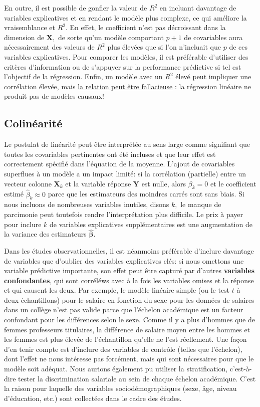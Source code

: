 \documentclass[
  11pt,
  letterpaper,
]{scrbook}
\theoremstyle{plain}
\theoremstyle{plain}
\theoremstyle{definition}
\theoremstyle{definition}
\theoremstyle{remark}
\begin{document}
En outre, il est possible de gonfler la valeur de \(R^2\) en incluant
davantage de variables explicatives et en rendant le modèle plus
complexe, ce qui améliore la vraisemblance et \(R^2.\) En effet, le
coefficient n'est pas décroissant dans la dimension de \(\mathbf{X},\)
de sorte qu'un modèle comportant \(p+1\) de covariables aura
nécessairement des valeurs de \(R^2\) plus élevées que si l'on
n'incluait que \(p\) de ces variables explicatives. Pour comparer les
modèles, il est préférable d'utiliser des critères d'information ou de
s'appuyer sur la performance prédictive si tel est l'objectif de la
régression. Enfin, un modèle avec un \(R^2\) élevé peut impliquer une
corrélation élevée, mais
\href{http://www.tylervigen.com/spurious-correlations}{la relation peut
être fallacieuse} : la régression linéaire ne produit pas de modèles
causaux!

\subsection{Colinéarité}\label{colinuxe9arituxe9}

Le postulat de linéarité peut être interprétée au sens large comme
signifiant que toutes les covariables pertinentes ont été incluses et
que leur effet est correctement spécifié dans l'équation de la moyenne.
L'ajout de covariables superflues à un modèle a un impact limité: si la
corrélation (partielle) entre un vecteur colonne \(\boldsymbol{X}_k\) et
la variable réponse \(\boldsymbol{Y}\) est nulle, alors \(\beta_k=0\) et
le coefficient estimé \(\widehat{\beta}_k \approx 0\) parce que les
estimateurs des moindres carrés sont sans biais. Si nous incluons de
nombreuses variables inutiles, disons \(k,\) le manque de parcimonie
peut toutefois rendre l'interprétation plus difficile. Le prix à payer
pour inclure \(k\) de variables explicatives supplémentaires est une
augmentation de la variance des estimateurs
\(\widehat{\boldsymbol{\beta}}.\)

Dans les études observationnelles, il est néanmoins préférable d'inclure
davantage de variables que d'oublier des variables explicatives clés: si
nous omettons une variable prédictive importante, son effet peut être
capturé par d'autres \textbf{variables confondantes}, qui sont corréléws
avec à la fois les variables omises et la réponse et qui causent les
deux. Par exemple, le modèle linéaire simple (ou le test \(t\) à deux
échantillons) pour le salaire en fonction du sexe pour les données de
salaires dans un collège n'est pas valide parce que l'échelon académique
est un facteur confondant pour les différences selon le sexe. Comme il y
a plus d'hommes que de femmes professeurs titulaires, la différence de
salaire moyen entre les hommes et les femmes est plus élevée de
l'échantillon qu'elle ne l'est réellement. Une façon d'en tenir compte
est d'inclure des variables de contrôle (telles que l'échelon), dont
l'effet ne nous intéresse pas forcément, mais qui sont nécessaires pour
que le modèle soit adéquat. Nous aurions également pu utiliser la
stratification, c'est-à-dire tester la discrimination salariale au sein
de chaque échelon académique. C'est la raison pour laquelle des
variables sociodémographiques (sexe, âge, niveau d'éducation, etc.) sont
collectées dans le cadre des études.
\end{document}
